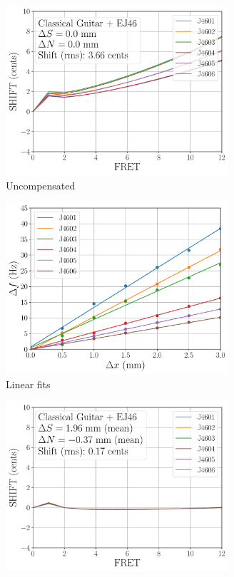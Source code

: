  \begin{figure}
  \centering
  \begin{subfigure}[b]{0.45\textwidth}
   \centering
   \includegraphics[width=3.25in]{figures/shift_classicalguitar_ej46_null}
   \caption{Uncompensated}
   \label{fig:shift_classicalguitar_ej46_null}
  \end{subfigure}
  \hspace{0.25in}
  \begin{subfigure}[b]{0.45\textwidth}
   \centering
   \includegraphics[width=3.25in]{figures/fit_ej46}
   \caption{Linear fits}
   \label{fig:fit_ej46}
  \end{subfigure}
  \par\vspace{0.25in}
  \begin{subfigure}[b]{0.45\textwidth}
   \centering
   \includegraphics[width=3.25in]{figures/shift_classicalguitar_ej46_full}

\end{subfigure}
\end{figure}
